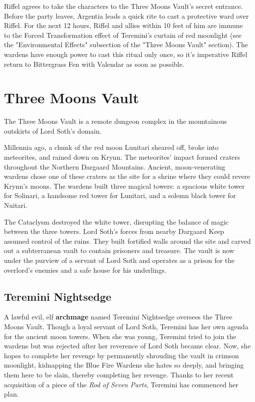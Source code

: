 \documentclass[10pt,a4paper,twoside,bg=print,twocolumn,openany,nodeprecatedcode]{dndbook}
\begin{document}
Riffel agrees to take the characters to the Three Moons Vault's secret entrance. Before the party leaves, Argentia leads a quick rite to cast a protective ward over Riffel. For the next 12 hours, Riffel and allies within 10 feet of him are immune to the Forced Transformation effect of Teremini's curtain of red moonlight (see the "Environmental Effects" subsection of the "Three Moons Vault" section). The wardens have enough power to cast this ritual only once, so it's imperative Riffel return to Bittergrass Fen with Valendar as soon as possible.

\section{Three Moons Vault}
The Three Moons Vault is a remote dungeon complex in the mountainous outskirts of Lord Soth's domain.

Millennia ago, a chunk of the red moon Lunitari sheared off, broke into meteorites, and rained down on Krynn. The meteorites' impact formed craters throughout the Northern Dargaard Mountains. Ancient, moon-venerating wardens chose one of these craters as the site for a shrine where they could revere Krynn's moons. The wardens built three magical towers: a spacious white tower for Solinari, a handsome red tower for Lunitari, and a solemn black tower for Nuitari.

The Cataclysm destroyed the white tower, disrupting the balance of magic between the three towers. Lord Soth's forces from nearby Dargaard Keep assumed control of the ruins. They built fortified walls around the site and carved out a subterranean vault to contain prisoners and treasure. The vault is now under the purview of a servant of Lord Soth and operates as a prison for the overlord's enemies and a safe house for his underlings.

\subsection{Teremini Nightsedge}
A lawful evil, elf \textbf{archmage} named Teremini Nightsedge oversees the Three Moons Vault. Though a loyal servant of Lord Soth, Teremini has her own agenda for the ancient moon towers. When she was young, Teremini tried to join the wardens but was rejected after her reverence of Lord Soth became clear. Now, she hopes to complete her revenge by permanently shrouding the vault in crimson moonlight, kidnapping the Blue Fire Wardens she hates so deeply, and bringing them here to be slain, thereby completing her revenge. Thanks to her recent acquisition of a piece of the \textit{Rod of Seven Parts}, Teremini has commenced her plan.
\end{document}
